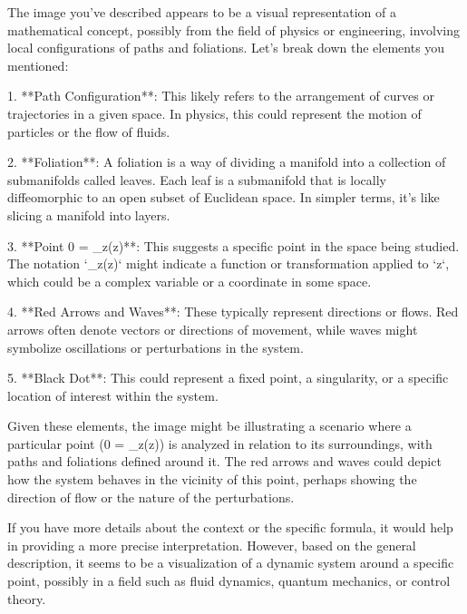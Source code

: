 The image you've described appears to be a visual representation of a mathematical concept, possibly from the field of physics or engineering, involving local configurations of paths and foliations. Let's break down the elements you mentioned:

1. **Path Configuration**: This likely refers to the arrangement of curves or trajectories in a given space. In physics, this could represent the motion of particles or the flow of fluids.

2. **Foliation**: A foliation is a way of dividing a manifold into a collection of submanifolds called leaves. Each leaf is a submanifold that is locally diffeomorphic to an open subset of Euclidean space. In simpler terms, it's like slicing a manifold into layers.

3. **Point 0 = _z(z)**: This suggests a specific point in the space being studied. The notation `_z(z)` might indicate a function or transformation applied to `z`, which could be a complex variable or a coordinate in some space.

4. **Red Arrows and Waves**: These typically represent directions or flows. Red arrows often denote vectors or directions of movement, while waves might symbolize oscillations or perturbations in the system.

5. **Black Dot**: This could represent a fixed point, a singularity, or a specific location of interest within the system.

Given these elements, the image might be illustrating a scenario where a particular point (0 = _z(z)) is analyzed in relation to its surroundings, with paths and foliations defined around it. The red arrows and waves could depict how the system behaves in the vicinity of this point, perhaps showing the direction of flow or the nature of the perturbations.

If you have more details about the context or the specific formula, it would help in providing a more precise interpretation. However, based on the general description, it seems to be a visualization of a dynamic system around a specific point, possibly in a field such as fluid dynamics, quantum mechanics, or control theory.